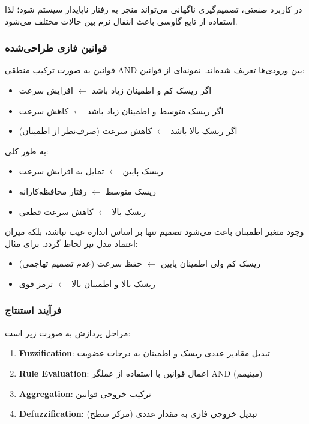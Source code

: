 \documentclass[a4paper, 10pt, twocolumn]{article}
\begin{document}
	در کاربرد صنعتی، تصمیم‌گیری ناگهانی می‌تواند منجر به رفتار ناپایدار سیستم شود؛ لذا استفاده از تابع گاوسی باعث انتقال نرم بین حالات مختلف می‌شود.
	
	
	
	\subsubsection{قوانین فازی طراحی‌شده}
	
	قوانین به صورت ترکیب منطقی AND بین ورودی‌ها تعریف شده‌اند. نمونه‌ای از قوانین:
	
	\begin{itemize}
		\item اگر ریسک کم و اطمینان زیاد باشد $\leftarrow$ افزایش سرعت
		\item اگر ریسک متوسط و اطمینان زیاد باشد $\leftarrow$ کاهش سرعت
		\item اگر ریسک بالا باشد $\leftarrow$ کاهش سرعت (صرف‌نظر از اطمینان)
	\end{itemize}
	
	به طور کلی:
	
	\begin{itemize}
		\item ریسک پایین $\leftarrow$ تمایل به افزایش سرعت
		\item ریسک متوسط $\leftarrow$ رفتار محافظه‌کارانه
		\item ریسک بالا $\leftarrow$ کاهش سرعت قطعی
	\end{itemize}
	
	وجود متغیر اطمینان باعث می‌شود تصمیم تنها بر اساس اندازه عیب نباشد، بلکه میزان اعتماد مدل نیز لحاظ گردد. برای مثال:
	
	\begin{itemize}
		\item ریسک کم ولی اطمینان پایین $\leftarrow$ حفظ سرعت (عدم تصمیم تهاجمی)
		\item ریسک بالا و اطمینان بالا $\leftarrow$ ترمز قوی
	\end{itemize}
	
	
	\subsubsection{فرآیند استنتاج}
	
	مراحل پردازش به صورت زیر است:
	
	\begin{enumerate}
		\item \textbf{Fuzzification}: تبدیل مقادیر عددی ریسک و اطمینان به درجات عضویت
		\item \textbf{Rule Evaluation}: اعمال قوانین با استفاده از عملگر AND (مینیمم)
		\item \textbf{Aggregation}: ترکیب خروجی قوانین
		\item \textbf{Defuzzification}: تبدیل خروجی فازی به مقدار عددی (مرکز سطح)
	\end{enumerate}
	
\end{document}
